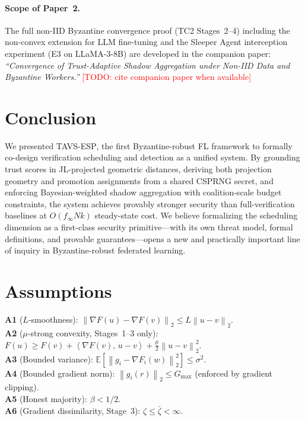\documentclass{article}
\newcommand{\E}{\mathbb{E}}
\newcommand{\norm}[1]{\left\lVert #1 \right\rVert}
\newcommand{\inner}[2]{\left\langle #1,\, #2 \right\rangle}
\newcommand{\finf}{f_{\infty}}       %
\newcommand{\TAVESP}{\textsc{TAVS-ESP}}
\newcommand{\todo}[1]{\textcolor{red}{[TODO: #1]}}
\begin{document}
\paragraph{Scope of Paper~2.}
The full non-IID Byzantine convergence proof (TC2 Stages~2--4) including the
non-convex extension for LLM fine-tuning and the Sleeper Agent interception
experiment (E3 on LLaMA-3-8B) are developed in the companion paper:
\emph{``Convergence of Trust-Adaptive Shadow Aggregation under Non-IID Data
and Byzantine Workers.''} \todo{cite companion paper when available}

\section{Conclusion}
\label{sec:conclusion}

We presented \TAVESP{}, the first Byzantine-robust FL framework to formally
co-design verification scheduling and detection as a unified system.
By grounding trust scores in JL-projected geometric distances, deriving both
projection geometry and promotion assignments from a shared CSPRNG secret, and
enforcing Bayesian-weighted shadow aggregation with coalition-scale budget
constraints, the system achieves provably stronger security than
full-verification baselines at $O(\finf Nk)$ steady-state cost.
We believe formalizing the scheduling dimension as a first-class security
primitive---with its own threat model, formal definitions, and provable
guarantees---opens a new and practically important line of inquiry in
Byzantine-robust federated learning.




\appendix

\section{Assumptions}
\label{app:assumptions}

\textbf{A1} ($L$-smoothness): $\norm{\nabla F(u) - \nabla F(v)}_2 \leq L\norm{u-v}_2$.\\
\textbf{A2} ($\mu$-strong convexity, Stages~1--3 only):
  $F(u) \geq F(v) + \inner{\nabla F(v)}{u-v} + \frac{\mu}{2}\norm{u-v}_2^2$.\\
\textbf{A3} (Bounded variance): $\E[\norm{g_i - \nabla F_i(w)}_2^2] \leq \sigma^2$.\\
\textbf{A4} (Bounded gradient norm): $\norm{g_i(r)}_2 \leq G_{\max}$
  (enforced by gradient clipping).\\
\textbf{A5} (Honest majority): $\beta < 1/2$.\\
\textbf{A6} (Gradient dissimilarity, Stage~3): $\zeta \leq \bar\zeta < \infty$.
\end{document}
